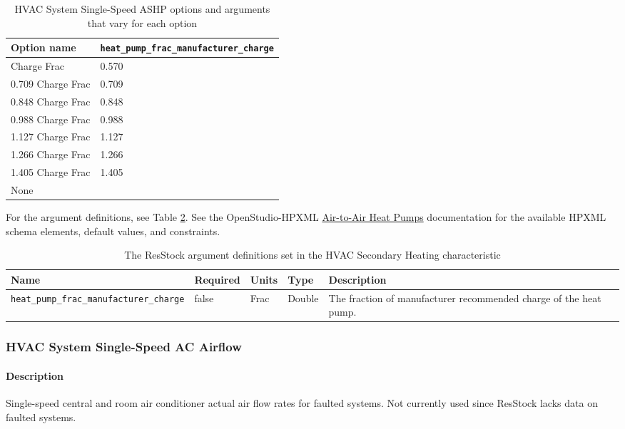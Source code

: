 \begin{longtable}[]{|p{3.5cm}|p{8cm}|}\caption{HVAC System Single-Speed ASHP options and arguments that vary for each option} \label{table:hc_opt_ss_hp_charge} \\
\toprule\noalign{}
Option name &
\texttt{heat\_pump\_frac\_manufacturer\_charge} \\
\midrule\noalign{}
\endhead
\bottomrule\noalign{}
\endlastfoot
0.570 Charge Frac & 0.570 \\
0.709 Charge Frac & 0.709 \\
0.848 Charge Frac & 0.848 \\
0.988 Charge Frac & 0.988 \\
1.127 Charge Frac & 1.127 \\
1.266 Charge Frac & 1.266 \\
1.405 Charge Frac & 1.405 \\
None & \\
\end{longtable}
For the argument definitions, see Table \ref{table:hc_arg_def_ss_hp_charge}. See the OpenStudio-HPXML \href{https://openstudio-hpxml.readthedocs.io/en/v1.8.1/workflow_inputs.html#air-to-air-heat-pump}{Air-to-Air Heat Pumps} documentation for the available HPXML schema elements, default values, and constraints.
\begin{longtable}[]{|p{3.5cm}|p{1.5cm}|p{1.3cm}|p{1.1cm}|p{3.5cm}|}\caption{The ResStock argument definitions set in the HVAC Secondary Heating characteristic} \label{table:hc_arg_def_ss_hp_charge}\\
\toprule\noalign{}
Name & Required & Units & Type &  Description \\
\midrule\noalign{}
\endhead
\bottomrule\noalign{}
\endlastfoot
\texttt{heat\_pump\_frac\_manufacturer\_charge} & false & Frac & Double
& The fraction of manufacturer recommended charge of the heat pump. \\
\end{longtable}

\subsubsection{HVAC System Single-Speed AC Airflow}

\paragraph{Description}
Single-speed central and room air conditioner actual air flow rates for faulted systems. Not currently used since ResStock lacks data on faulted systems. 

